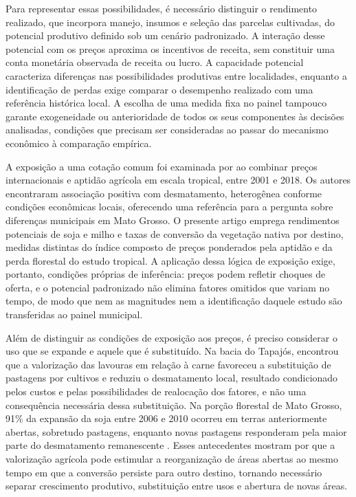Para representar essas possibilidades, é necessário distinguir o rendimento realizado, que incorpora manejo, insumos e seleção das parcelas cultivadas, do potencial produtivo definido sob um cenário padronizado. A interação desse potencial com os preços aproxima os incentivos de receita, sem constituir uma conta monetária observada de receita ou lucro. A capacidade potencial caracteriza diferenças nas possibilidades produtivas entre localidades, enquanto a identificação de perdas exige comparar o desempenho realizado com uma referência histórica local. A escolha de uma medida fixa no painel tampouco garante exogeneidade ou anterioridade de todos os seus componentes às decisões analisadas, condições que precisam ser consideradas ao passar do mecanismo econômico à comparação empírica.

A exposição a uma cotação comum foi examinada por  ao combinar preços internacionais e aptidão agrícola em escala tropical, entre 2001 e 2018. Os autores encontraram associação positiva com desmatamento, heterogênea conforme condições econômicas locais, oferecendo uma referência para a pergunta sobre diferenças municipais em Mato Grosso. O presente artigo emprega rendimentos potenciais de soja e milho e taxas de conversão da vegetação nativa por destino, medidas distintas do índice composto de preços ponderados pela aptidão e da perda florestal do estudo tropical. A aplicação dessa lógica de exposição exige, portanto, condições próprias de inferência: preços podem refletir choques de oferta, e o potencial padronizado não elimina fatores omitidos que variam no tempo, de modo que nem as magnitudes nem a identificação daquele estudo são transferidas ao painel municipal.

Além de distinguir as condições de exposição aos preços, é preciso considerar o uso que se expande e aquele que é substituído. Na bacia do Tapajós,  encontrou que a valorização das lavouras em relação à carne favoreceu a substituição de pastagens por cultivos e reduziu o desmatamento local, resultado condicionado pelos custos e pelas possibilidades de realocação dos fatores, e não uma consequência necessária dessa substituição. Na porção florestal de Mato Grosso, 91\% da expansão da soja entre 2006 e 2010 ocorreu em terras anteriormente abertas, sobretudo pastagens, enquanto novas pastagens responderam pela maior parte do desmatamento remanescente \cite{MacedoEtAl2012}. Esses antecedentes mostram por que a valorização agrícola pode estimular a reorganização de áreas abertas ao mesmo tempo em que a conversão persiste para outro destino, tornando necessário separar crescimento produtivo, substituição entre usos e abertura de novas áreas.

